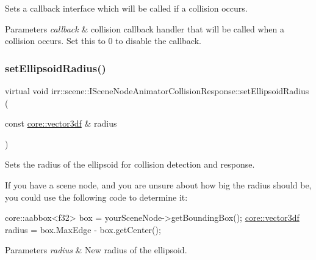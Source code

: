 Sets a callback interface which will be called if a collision occurs. 


\begin{DoxyParams}{Parameters}
{\em callback} & collision callback handler that will be called when a collision occurs. Set this to 0 to disable the callback. \\
\hline
\end{DoxyParams}
\mbox{\label{classirr_1_1scene_1_1ISceneNodeAnimatorCollisionResponse_a71af73590016ba936340a79467690d3f}} 
\subsubsection{\texorpdfstring{set\+Ellipsoid\+Radius()}{setEllipsoidRadius()}\hspace{0.1cm}{\footnotesize\ttfamily [1/2]}}
{\footnotesize\ttfamily virtual void irr\+::scene\+::\+I\+Scene\+Node\+Animator\+Collision\+Response\+::set\+Ellipsoid\+Radius (\begin{DoxyParamCaption}\item[{const \hyperlink{namespaceirr_1_1core_ae6e2b2a6c552833ebbd5b7463d03586b}{core\+::vector3df} \&}]{radius }\end{DoxyParamCaption})\hspace{0.3cm}{\ttfamily [pure virtual]}}



Sets the radius of the ellipsoid for collision detection and response. 

If you have a scene node, and you are unsure about how big the radius should be, you could use the following code to determine it\+: 
\begin{DoxyCode}
core::aabbox<f32> box = yourSceneNode->getBoundingBox();
\hyperlink{namespaceirr_1_1core_ae6e2b2a6c552833ebbd5b7463d03586b}{core::vector3df} radius = box.MaxEdge - box.getCenter();
\end{DoxyCode}
 
\begin{DoxyParams}{Parameters}
{\em radius} & New radius of the ellipsoid. \\
\hline
\end{DoxyParams}
\mbox{\label{classirr_1_1scene_1_1ISceneNodeAnimatorCollisionResponse_a71af73590016ba936340a79467690d3f}} 
